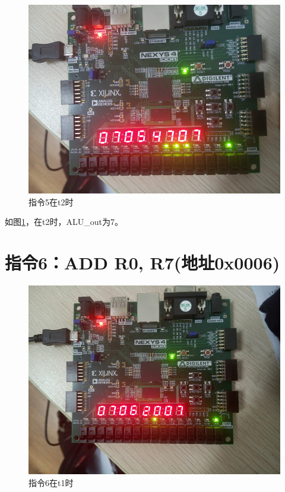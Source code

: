 \documentclass[forprint]{WHUBachelor}
\begin{document}
\begin{figure}[H]
  \centering
  \includegraphics[width=5in]{figures/download/41.jpg}
  \caption{指令5在t2时}
  \label{fig:down:41}
\end{figure}

如图\ref{fig:down:41}，在t2时，ALU\_out为7。

\section{指令6：ADD R0, R7(地址0x0006)}

\begin{figure}[H]
  \centering
  \includegraphics[width=5in]{figures/download/50.jpg}
  \caption{指令6在t1时}
  \label{fig:down:50}
\end{figure}
\end{document}
